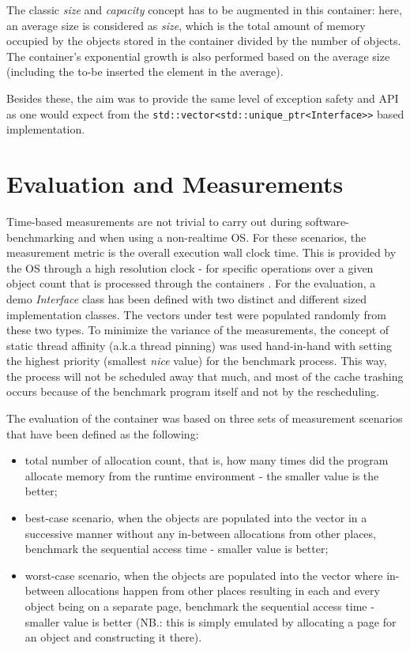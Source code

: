 \documentclass[a4paper,12pt]{article}
\begin{document}
The classic \emph{size} and \emph{capacity} concept has to be augmented in this container: here, an average size is considered as \emph{size}, which is the total amount of memory occupied by the objects stored in the container divided by the number of objects. The container's exponential growth  is also performed based on the average size (including the to-be inserted the element in the average).

Besides these, the aim was to provide the same level of exception safety and API as one would expect from the \lstinline{std::vector<std::unique_ptr<Interface>>} based implementation.


\section{Evaluation and Measurements}

Time-based measurements are not trivial to carry out during software-benchmarking  and when using a non-realtime OS. For these scenarios, the measurement metric is the overall execution wall clock time. This is provided by the OS through a high resolution clock - for specific operations over a given object count that is processed through the containers \cite{Measuring_Throughput}. For the evaluation, a demo \emph{Interface} class has been defined with two distinct and different sized implementation classes. The vectors under test were populated randomly from these two types. To minimize the variance of the measurements, the concept of static thread affinity (a.k.a thread pinning) was used hand-in-hand with setting the highest priority (smallest \emph{nice} value) for the benchmark process. This way, the process will not be scheduled away that much, and most of the cache trashing occurs because of the benchmark program itself and not by the rescheduling. 


The evaluation of the container was based on three sets of measurement scenarios that have been defined as the following:
\begin{itemize}
    \item total number of allocation count, that is, how many times  did the program allocate memory from the runtime environment - the smaller value is the better;
    \item best-case scenario, when the objects are populated into the vector in a successive manner without any in-between allocations from other places, benchmark the sequential access time - smaller value is better;
    \item worst-case scenario, when the objects are populated into the vector where in-between allocations happen from other places resulting in each and every object being on a separate page, benchmark the sequential access time - smaller value is better (NB.: this is simply emulated by allocating a page for an object and constructing it there).
\end{itemize}
\end{document}
